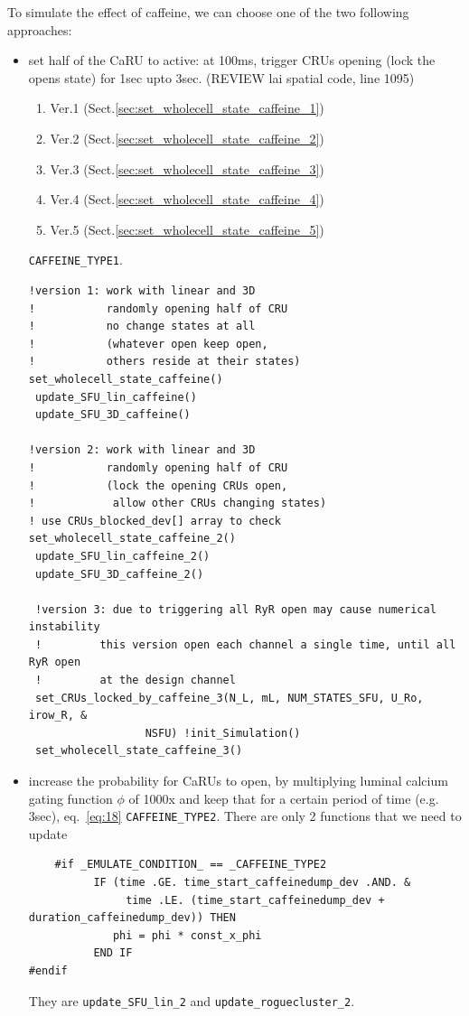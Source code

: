 To simulate the effect of caffeine, we can choose one of the two
following approaches:

  \begin{itemize}
  \item set half of the CaRU to active: at 100ms, trigger CRUs opening (lock
  the opens state) for 1sec upto 3sec. (REVIEW lai spatial code, line 1095)
  \begin{enumerate}
    \item Ver.1 (Sect.\ref{sec:set_wholecell_state_caffeine_1})
    \item Ver.2 (Sect.\ref{sec:set_wholecell_state_caffeine_2})
    \item Ver.3 (Sect.\ref{sec:set_wholecell_state_caffeine_3})
    \item Ver.4 (Sect.\ref{sec:set_wholecell_state_caffeine_4})
    \item Ver.5 (Sect.\ref{sec:set_wholecell_state_caffeine_5})
  \end{enumerate}
\verb!CAFFEINE_TYPE1!.
\begin{verbatim}
!version 1: work with linear and 3D
!           randomly opening half of CRU
!           no change states at all 
!           (whatever open keep open,
!           others reside at their states)
set_wholecell_state_caffeine()
 update_SFU_lin_caffeine()
 update_SFU_3D_caffeine()

!version 2: work with linear and 3D
!           randomly opening half of CRU
!           (lock the opening CRUs open,
!            allow other CRUs changing states)
! use CRUs_blocked_dev[] array to check
set_wholecell_state_caffeine_2()
 update_SFU_lin_caffeine_2()
 update_SFU_3D_caffeine_2()
 
 !version 3: due to triggering all RyR open may cause numerical instability
 !         this version open each channel a single time, until all RyR open
 !         at the design channel
 set_CRUs_locked_by_caffeine_3(N_L, mL, NUM_STATES_SFU, U_Ro, irow_R, &
                  NSFU) !init_Simulation() 
 set_wholecell_state_caffeine_3()
\end{verbatim}

  \item increase the probability for CaRUs to open, by multiplying
    luminal calcium gating function $\phi$ of 1000x and keep that for a certain
    period of time (e.g. 3sec), eq.~\eqref{eq:18} \verb!CAFFEINE_TYPE2!. There
    are only 2 functions that we need to update
    \begin{verbatim}
    #if _EMULATE_CONDITION_ == _CAFFEINE_TYPE2
          IF (time .GE. time_start_caffeinedump_dev .AND. &
               time .LE. (time_start_caffeinedump_dev + duration_caffeinedump_dev)) THEN
             phi = phi * const_x_phi
          END IF
#endif
    \end{verbatim}
    They are \verb!update_SFU_lin_2! and \verb!update_roguecluster_2!.
  \end{itemize}
  

